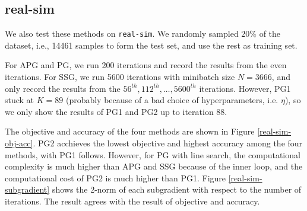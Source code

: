 \documentclass{article}
\numberwithin{equation}{section}
\numberwithin{figure}{section}
\begin{document}






\subsection{real-sim}

We also test these methods on \texttt{real-sim}. We randomly sampled $20\%$ of the dataset, i.e., 14461 samples to form the test set, and use the rest as training set. 

For APG and PG, we run 200 iterations and record the results from the even iterations. For SSG, we run 5600 iterations with minibatch size $N = 3666$, and only record the results from the $56^{th}, 112^{th}, \hdots, 5600^{th} $ iterations. However, PG1 stuck at $K = 89$ (probably because of a bad choice of hyperparameters, i.e. $\eta$), so we only show the results of PG1 and PG2 up to iteration 88.

The objective and accuracy of the four methods are shown in Figure \ref{real-sim-obj-acc}. PG2 acchieves the lowest objective and highest accuracy among the four methods, with PG1 follows. However, for PG with line search, the computational complexity is much higher than APG and SSG because of the inner loop, and the computational cost of PG2 is much higher than PG1. Figure \ref{real-sim-subgradient} shows the 2-norm of each subgradient with respect to the number of iterations. The result agrees with the result of objective and accuracy.
\end{document}
